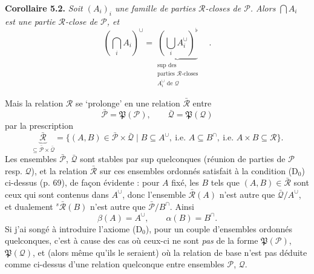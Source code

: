 \documentclass[11pt]{article}
\newcommand{\printedpage}[1]{\marginpar{\footnotesize p.~#1}}
\newcommand{\msp}[1]{\marginpar{\footnotesize [#1]}}
\newcommand{\cP}{\mathcal{P}}
\newcommand{\cQ}{\mathcal{Q}}
\newcommand{\cR}{\mathcal{R}}
\newcommand{\fP}{\mathfrak{P}}
\begin{document}
\textbf{Corollaire 5.2.} \textit{Soit $(A_i)_i$ une famille de parties $\cR$-closes de $\cP$. Alors $\bigcap A_i$ est une partie $\cR$-close de $\cP$, et}
\[
(\bigcap_i A_i)^{\cup} = \underbrace{(\bigcup_i A_i^{\cup})^{\flat}}_{\substack{\text{sup des}\\ \text{parties } \cR\text{-closes}\\ A_i^{\cup} \text{ de } \cQ}} \quad .
\tag*{(5.2.1)}
\]

Mais la relation $\cR$ se `prolonge' en une relation $\bar{\cR}$ entre
\[
\bar{\cP} = \fP(\cP), \qquad \bar{\cQ} = \fP(\cQ)
\tag*{(5.13)}
\]
par la prescription
\[
\underbrace{\bar{\cR}}_{\subseteq \bar{\cP} \times \bar{\cQ}} = \{(A,B) \in \bar{\cP} \times \bar{\cQ} \mid B \subseteq A^{\cup},\ \text{i.e. } A \subseteq B^{\cap},\ \text{i.e. } A \times B \subseteq \cR\}.
\tag*{(5.14)}
\]
Les ensembles $\bar{\cP}$, $\bar{\cQ}$ sont stables par sup quelconques (réunion de parties de $\cP$ resp. $\cQ$), et la relation $\bar{\cR}$ sur ces ensembles ordonnés satisfait à la condition (D$_0$)
\printedpage{46}
\msp{74}
ci-dessus (p. 69), de façon évidente : pour $A$ fixé, les $B$ tels que $(A,B) \in \bar{\cR}$ sont ceux qui sont contenus dans $A^{\cup}$, donc l'ensemble $\bar{\cR}(A)$ n'est autre que $\bar{\cQ}/A^{\cup}$, et dualement ${}^{s}\bar{\cR}(B)$ n'est autre que $\bar{\cP}/B^{\cap}$. Ainsi
\[
\beta(A) = A^{\cup}, \qquad \alpha(B) = B^{\cap}.
\tag*{(5.14)} %
\]
Si j'ai songé à introduire l'axiome (D$_0$), pour un couple d'ensembles ordonnés quelconques, c'est à cause des cas où ceux-ci ne sont \textit{pas} de la forme $\fP(\cP)$, $\fP(\cQ)$, et (alors même qu'ils le seraient) où la relation de base n'est pas déduite comme ci-dessus d'une relation quelconque entre ensembles $\cP$, $\cQ$.
\end{document}
